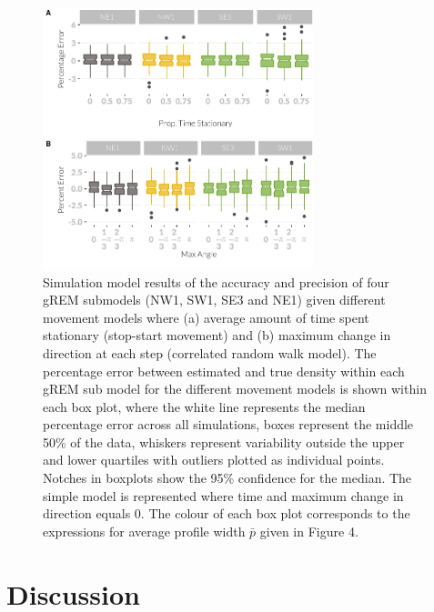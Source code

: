 \begin{knitrout}\footnotesize
{}\color{fgcolor}\begin{figure}[t]

{\centering \includegraphics[width=0.7\textwidth]{figure/movtFig-1} 

}

\caption[Simulation model results of the accuracy and precision of four gREM submodels]{
Simulation model results of the accuracy and precision of four gREM submodels (NW1, SW1, SE3 and NE1) given different movement models where (a) average amount of time spent stationary (stop-start movement) and (b) maximum change in direction at each step (correlated random walk model).
The percentage error between estimated and true density within each gREM sub model for the different movement models is shown within each box plot, where the white line represents the median percentage error across all simulations, boxes represent the middle 50\% of the data, whiskers represent variability outside the upper and lower quartiles with outliers plotted as individual points.
Notches in boxplots show the 95\% confidence for the median.
The simple model is represented where time and maximum change in direction equals 0.
The colour of each box plot corresponds to the expressions for average profile width $\bar{p}$ given in Figure 4.
}\label{fig:movtFig}
\end{figure}


\end{knitrout}

                  
\section{Discussion}

